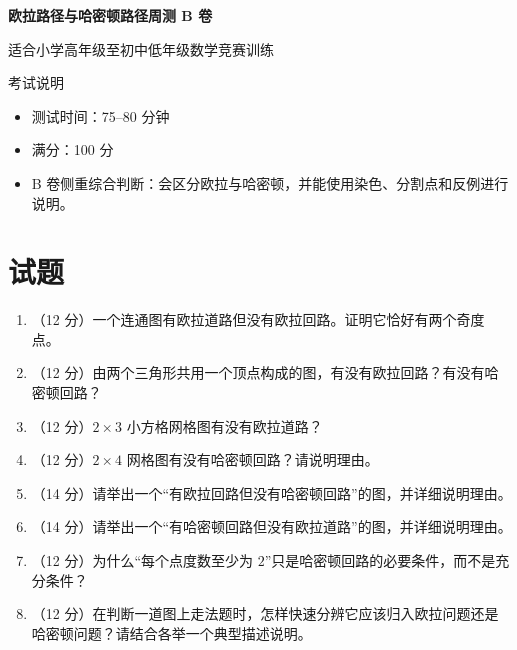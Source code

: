\documentclass[11pt,a4paper,fontset=fandol]{ctexart}
\newcommand{\answerspace}{\vspace{2.3cm}}
\newcommand{\biganswerspace}{\vspace{3.1cm}}
\begin{document}
\thispagestyle{empty}
\begin{center}
{\fontsize{22}{28}\selectfont\bfseries 欧拉路径与哈密顿路径周测 B 卷\par}
\vspace{0.4cm}
{\large 适合小学高年级至初中低年级数学竞赛训练\par}
\end{center}

\begin{infobox}{考试说明}
\begin{itemize}
  \item 测试时间：75--80 分钟
  \item 满分：100 分
  \item B 卷侧重综合判断：会区分欧拉与哈密顿，并能使用染色、分割点和反例进行说明。
\end{itemize}
\end{infobox}

\section{试题}

\begin{enumerate}
  \item （12 分）一个连通图有欧拉道路但没有欧拉回路。证明它恰好有两个奇度点。
  \answerspace

  \item （12 分）由两个三角形共用一个顶点构成的图，有没有欧拉回路？有没有哈密顿回路？
  \answerspace

  \item （12 分）$2\times 3$ 小方格网格图有没有欧拉道路？
  \answerspace

  \item （12 分）$2\times 4$ 网格图有没有哈密顿回路？请说明理由。
  \answerspace

  \item （14 分）请举出一个“有欧拉回路但没有哈密顿回路”的图，并详细说明理由。
  \biganswerspace

  \item （14 分）请举出一个“有哈密顿回路但没有欧拉道路”的图，并详细说明理由。
  \biganswerspace

  \item （12 分）为什么“每个点度数至少为 $2$”只是哈密顿回路的必要条件，而不是充分条件？
  \answerspace

  \item （12 分）在判断一道图上走法题时，怎样快速分辨它应该归入欧拉问题还是哈密顿问题？请结合各举一个典型描述说明。
  \answerspace
\end{enumerate}
\end{document}
